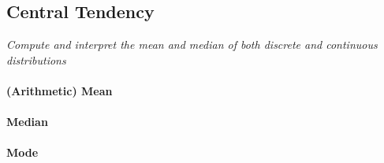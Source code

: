 \subsection[central values]{Central Tendency}

\textit{Compute and interpret the mean and median of both discrete and continuous distributions}

\vspace{.5cm}


\vspace{.5cm}

\paragraph*{(Arithmetic) Mean} 
\paragraph*{Median} 
\paragraph*{Mode} 


